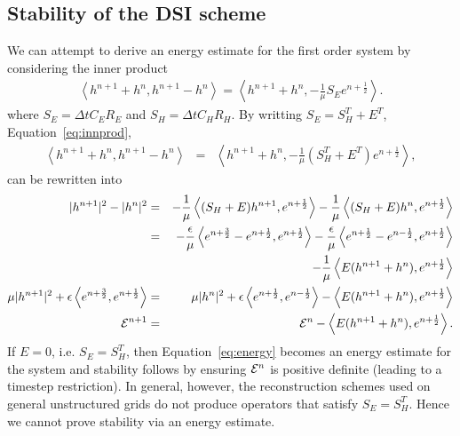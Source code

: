 \documentclass[12pt]{article}
\begin{document}



%


\subsection{Stability of the {DSI} scheme}
We can attempt to derive an energy estimate for the first order system by considering
the inner product 
\begin{eqnarray}
\left<h^{n+1}+h^n,h^{n+1}-h^n\right> = \left<h^{n+1}+h^n,-\frac{1}{\mu}S_Ee^{n+\frac{1}{2}}\right>.\label{eq:innprod}
\end{eqnarray}
where $S_E = \Delta t C_E R_E$ and $S_H =\Delta t C_H
R_H$.  By writting $S_E = S_H^T + E^T$,
Equation~\ref{eq:innprod}, 
\begin{eqnarray}
\left<h^{n+1}+h^n,h^{n+1}-h^n\right> &=& \left<h^{n+1}+h^n,-\frac{1}{\mu}(S_H^T + E^T)e^{n+\frac{1}{2}}\right>,
\end{eqnarray}
can be rewritten into
\begin{eqnarray}
|h^{n+1}|^2 - |h^n|^2  &=& -\frac{1}{\mu}\left<(S_H+E)h^{n+1},e^{n+\frac{1}{2}}\right> - \frac{1}{\mu}\left<(S_H+E)h^{n},e^{n+\frac{1}{2}}\right>\\
                       &=&  -\frac{\epsilon}{\mu}\left<e^{n+\frac{3}{2}}-e^{n+\frac{1}{2}},e^{n+\frac{1}{2}}\right> - \frac{\epsilon}{\mu}\left<e^{n+\frac{1}{2}}-e^{n-\frac{1}{2}},e^{n+\frac{1}{2}}\right> \nonumber\\
                       & & - \frac{1}{\mu}\left< E(h^{n+1}+h^n), e^{n+\frac{1}{2}}\right>\\
\mu |h^{n+1}|^2 + \epsilon\left<e^{n+\frac{3}{2}},e^{n+\frac{1}{2}}\right> &=& \mu |h^n|^2 + \epsilon\left<e^{n+\frac{1}{2}},e^{n-\frac{1}{2}}\right> - \left< E(h^{n+1}+h^n), e^{n+\frac{1}{2}}\right>\\
{\cal E}^{n+1} &=& {\cal E}^n - \left< E(h^{n+1}+h^n), e^{n+\frac{1}{2}}\right>.\label{eq:energy}
\end{eqnarray}
If $E=0$, i.e. $S_E = S_H^T$, then Equation~\ref{eq:energy} becomes an
energy estimate for the system and stability follows by ensuring
${\cal E}^n$ is positive definite (leading to a timestep restriction).
In general, however, the reconstruction schemes used on general
unstructured grids do not produce operators that satisfy $S_E=S_H^T$.
Hence we cannot prove stability via an energy estimate.
\end{document}
